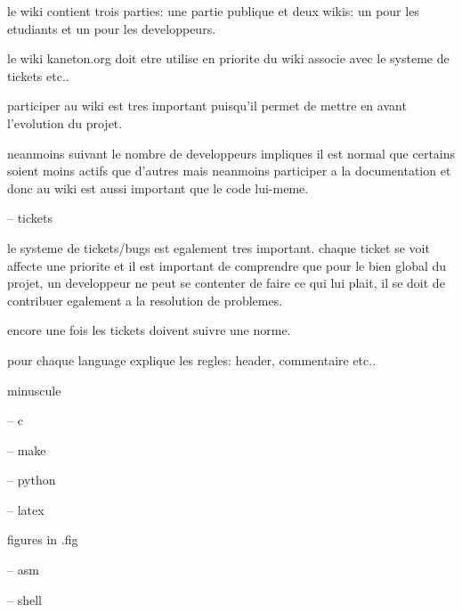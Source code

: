 le wiki contient trois parties: une partie publique et deux wikis: un pour
les etudiants et un pour les developpeurs.

le wiki kaneton.org doit etre utilise en priorite du wiki associe avec
le systeme de tickets etc..

participer au wiki est tres important puisqu'il permet de mettre en avant
l'evolution du projet.

neanmoins suivant le nombre de developpeurs impliques il est normal que
certains soient moins actifs que d'autres mais neanmoins participer a
la documentation et donc au wiki est aussi important que le code lui-meme.

-- tickets

le systeme de tickets/bugs est egalement tres important. chaque ticket se
voit affecte une priorite et il est important de comprendre que pour le
bien global du projet, un developpeur ne peut se contenter de faire ce
qui lui plait, il se doit de contribuer egalement a la resolution de problemes.

encore une fois les tickets doivent suivre une norme.

%
%

pour chaque language explique les regles: header, commentaire etc..

minuscule

-- c

-- make

-- python

-- latex

figures in .fig

-- asm

-- shell
